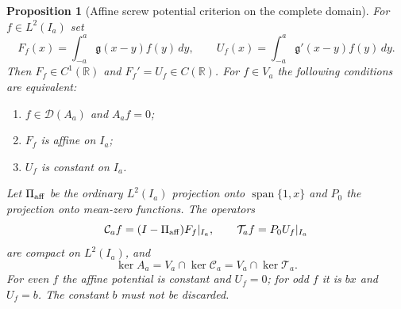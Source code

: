 \documentclass[11pt]{article}
\newtheorem{proposition}[theorem]{Proposition}
\theoremstyle{remark}
\begin{document}
\begin{proposition}[Affine screw potential criterion on the complete domain]
\label{prop:ns51-affine-potential}
For $f\in L^2(I_a)$ set
\[
 F_f(x)=\int_{-a}^a\mathfrak g(x-y)f(y)\,dy,\qquad
 U_f(x)=\int_{-a}^a\mathfrak g'(x-y)f(y)\,dy.
\]
Then $F_f\in C^1(\mathbb R)$ and $F_f'=U_f\in C(\mathbb R)$.
For $f\in V_a$ the following conditions are equivalent:
\begin{enumerate}[label=(\roman*)]
 \item $f\in\mathcal D(A_a)$ and $A_af=0$;
 \item $F_f$ is affine on $I_a$;
 \item $U_f$ is constant on $I_a$.
\end{enumerate}
Let $\Pi_{\rm aff}$ be the ordinary $L^2(I_a)$ projection onto
$\operatorname{span}\{1,x\}$ and $P_0$ the projection onto mean-zero
functions. The operators
\[
 \mathcal C_a f=(I-\Pi_{\rm aff})F_f|_{I_a},\qquad
 \mathcal T_a f=P_0 U_f|_{I_a}
\]
are compact on $L^2(I_a)$, and
\begin{equation}\label{eq:ns51-kernel-reduction}
 \ker A_a=V_a\cap\ker\mathcal C_a=V_a\cap\ker\mathcal T_a.
\end{equation}
For even $f$ the affine potential is constant and $U_f=0$; for odd
$f$ it is $b x$ and $U_f=b$. The constant $b$ must not be discarded.
\end{proposition}
\end{document}
